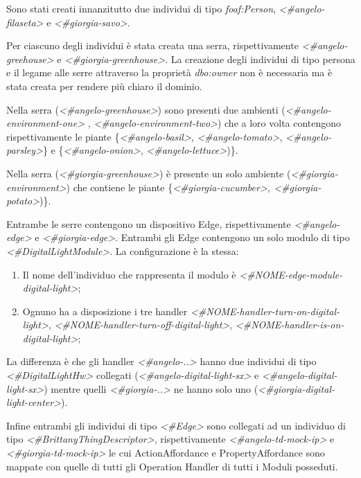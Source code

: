 \noindent Sono stati creati innanzitutto due individui di tipo \textit{foaf:Person}, \textit{<\#angelo-filaseta>} e \textit{<\#giorgia-savo>}.\newline

\noindent Per ciascuno degli individui è stata creata una serra, rispettivamente \textit{<\#angelo-greehouse>} e \textit{<\#giorgia-greenhouse>}. La creazione degli individui di tipo persona e il legame alle serre attraverso la proprietà \textit{dbo:owner} non è necessaria ma è stata creata per rendere più chiaro il dominio.\newline

\noindent Nella serra (\textit{<\#angelo-greenhouse>}) sono presenti due ambienti (\textit{<\#angelo-environment-one>} , \textit{<\#angelo-environment-two>}) che a loro volta contengono rispettivamente le piante \{\textit{<\#angelo-basil>}, \textit{<\#angelo-tomato>}, \textit{<\#angelo-parsley>}\} e \{\textit{<\#angelo-onion>}, \textit{<\#angelo-lettuce>})\}.\newline

\noindent Nella serra (\textit{<\#giorgia-greenhouse>}) è presente un solo ambiente (\textit{<\#giorgia-environment>}) che contiene le piante \{\textit{<\#giorgia-cucumber>, <\#giorgia-potato>})\}. \newline

\noindent Entrambe le serre contengono un dispositivo Edge, rispettivamente \textit{<\#angelo-edge>} e \textit{<\#giorgia-edge>}. Entrambi gli Edge contengono un solo modulo di tipo \textit{<\#DigitalLightModule>}. La configurazione è la stessa:
\begin{enumerate}
	\item Il nome dell'individuo che rappresenta il modulo è \textit{<\#NOME-edge-module-digital-light>};
	\item Ognuno ha a disposizione i tre handler \textit{<\#NOME-handler-turn-on-digital-light>}, \textit{<\#NOME-handler-turn-off-digital-light>}, \textit{<\#NOME-handler-is-on-digital-light>};
\end{enumerate}
La differenza è che gli handler \textit{<\#angelo-..>} hanno due individui di tipo \textit{<\#DigitalLightHw>} collegati (\textit{<\#angelo-digital-light-sx>} e \textit{<\#angelo-digital-light-sx>}) mentre quelli \textit{<\#giorgia-..>} ne hanno solo uno (\textit{<\#giorgia-digital-light-center>}).\newline

\noindent Infine entrambi gli individui di tipo \textit{<\#Edge>} sono collegati ad un individuo di tipo \textit{<\#BrittanyThingDescriptor>}, rispettivamente \textit{<\#angelo-td-mock-ip>} e \textit{<\#giorgia-td-mock-ip>} le cui ActionAffordance e PropertyAffordance sono mappate con quelle di tutti gli Operation Handler di tutti i Moduli posseduti.
